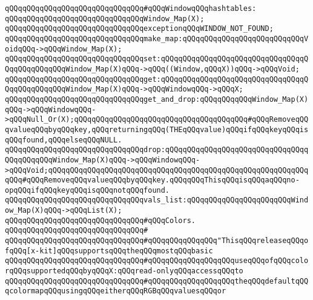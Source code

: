 \newline
\verb|qQQqqQQqqQQqqQQqqQQqqQQqqQQqqQQq#qQQqWindowqQQqhashtables:|\newline
\newline
\verb|qQQqqQQqqQQqqQQqqQQqqQQqqQQqqQQqWindow_Map(X);|\newline
\newline
\verb|qQQqqQQqqQQqqQQqqQQqqQQqqQQqqQQqexceptionqQQqWINDOW_NOT_FOUND;|\newline
\newline
\verb|qQQqqQQqqQQqqQQqqQQqqQQqqQQqqQQqmake_map:qQQqqQQqqQQqqQQqqQQqqQQqqQQqVoidqQQq->qQQqWindow_Map(X);|\newline
\verb|qQQqqQQqqQQqqQQqqQQqqQQqqQQqqQQqset:qQQqqQQqqQQqqQQqqQQqqQQqqQQqqQQqqQQqqQQqqQQqqQQqWindow_Map(X)qQQq->qQQq((Window,qQQqX))qQQq->qQQqVoid;|\newline
\verb|qQQqqQQqqQQqqQQqqQQqqQQqqQQqqQQqget:qQQqqQQqqQQqqQQqqQQqqQQqqQQqqQQqqQQqqQQqqQQqqQQqWindow_Map(X)qQQq->qQQqWindowqQQq->qQQqX;|\newline
\verb|qQQqqQQqqQQqqQQqqQQqqQQqqQQqqQQqget_and_drop:qQQqqQQqqQQqWindow_Map(X)qQQq->qQQqWindowqQQq->qQQqNull_Or(X);qQQqqQQqqQQqqQQqqQQqqQQqqQQqqQQqqQQqqQQq#qQQqRemoveqQQqvalueqQQqbyqQQqkey,qQQqreturningqQQq(THEqQQqvalue)qQQqifqQQqkeyqQQqisqQQqfound,qQQqelseqQQqNULL.|\newline
\verb|qQQqqQQqqQQqqQQqqQQqqQQqqQQqqQQqdrop:qQQqqQQqqQQqqQQqqQQqqQQqqQQqqQQqqQQqqQQqqQQqWindow_Map(X)qQQq->qQQqWindowqQQq->qQQqVoid;qQQqqQQqqQQqqQQqqQQqqQQqqQQqqQQqqQQqqQQqqQQqqQQqqQQqqQQqqQQqqQQq#qQQqRemoveqQQqvalueqQQqbyqQQqkey.qQQqqQQqThisqQQqisqQQqaqQQqno-opqQQqifqQQqkeyqQQqisqQQqnotqQQqfound.|\newline
\verb|qQQqqQQqqQQqqQQqqQQqqQQqqQQqqQQqvals_list:qQQqqQQqqQQqqQQqqQQqqQQqWindow_Map(X)qQQq->qQQqList(X);|\newline
\newline
\newline
\verb|qQQqqQQqqQQqqQQqqQQqqQQqqQQqqQQq#qQQqColors.|\newline
\verb|qQQqqQQqqQQqqQQqqQQqqQQqqQQqqQQq#|\newline
\verb|qQQqqQQqqQQqqQQqqQQqqQQqqQQqqQQq#qQQqqQQqqQQqqQQq"ThisqQQqreleaseqQQqofqQQq[x-kit]qQQqsupportsqQQqtheqQQqmostqQQqbasic|\newline
\verb|qQQqqQQqqQQqqQQqqQQqqQQqqQQqqQQq#qQQqqQQqqQQqqQQqqQQquseqQQqofqQQqcolorqQQqsupportedqQQqbyqQQqX:qQQqread-onlyqQQqaccessqQQqto|\newline
\verb|qQQqqQQqqQQqqQQqqQQqqQQqqQQqqQQq#qQQqqQQqqQQqqQQqqQQqtheqQQqdefaultqQQqcolormapqQQqusingqQQqeitherqQQqRGBqQQqvaluesqQQqor|\newline
